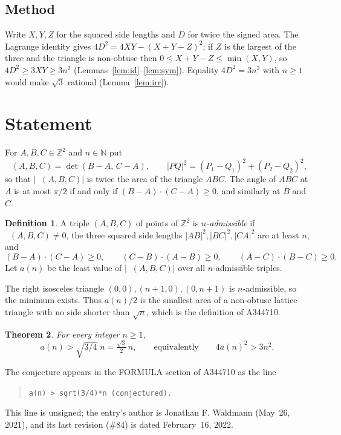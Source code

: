 \documentclass[11pt]{amsart}
\theoremstyle{plain}
\newtheorem{theorem}{Theorem}
\theoremstyle{definition}
\newtheorem{definition}[theorem]{Definition}
\newcommand{\N}{\mathbb{N}}
\newcommand{\Z}{\mathbb{Z}}
\DeclareMathOperator{\dett}{det_2}
\begin{document}
\subsection*{Method}
Write $X,Y,Z$ for the squared side lengths and $D$ for twice the signed area. The Lagrange identity gives $4D^2=4XY-(X+Y-Z)^2$; if $Z$ is the largest of the three and the triangle is non-obtuse then $0\le X+Y-Z\le\min(X,Y)$, so $4D^2\ge3XY\ge3n^2$ (Lemmas~\ref{lem:id}--\ref{lem:sym}). Equality $4D^2=3n^2$ with $n\ge1$ would make $\sqrt3$ rational (Lemma~\ref{lem:irr}).

\section{Statement}\label{sec:statement}

For $A,B,C\in\Z^2$ and $n\in\N$ put
\[
  \dett(A,B,C)=\det(B-A,\,C-A),\qquad |PQ|^2=(P_1-Q_1)^2+(P_2-Q_2)^2 ,
\]
so that $|\dett(A,B,C)|$ is twice the area of the triangle $ABC$. The angle of $ABC$ at $A$ is at most $\pi/2$ if and only if $(B-A)\cdot(C-A)\ge0$, and similarly at $B$ and $C$.

\begin{definition}\label{def:adm}
A triple $(A,B,C)$ of points of $\Z^2$ is \emph{$n$-admissible} if $\dett(A,B,C)\ne0$, the three squared side lengths $|AB|^2,|BC|^2,|CA|^2$ are at least $n$, and
\[
  (B-A)\cdot(C-A)\ge0,\qquad (C-B)\cdot(A-B)\ge0,\qquad (A-C)\cdot(B-C)\ge0 .
\]
Let $a(n)$ be the least value of $|\dett(A,B,C)|$ over all $n$-admissible triples.
\end{definition}

The right isosceles triangle $(0,0),(n+1,0),(0,n+1)$ is $n$-admissible, so the minimum exists. Thus $a(n)/2$ is the smallest area of a non-obtuse lattice triangle with no side shorter than $\sqrt n$, which is the definition of A344710.

\begin{theorem}\label{thm:main}
For every integer $n\ge1$,
\[
  a(n)>\sqrt{3/4}\;n=\tfrac{\sqrt3}{2}\,n ,\qquad\text{equivalently}\qquad 4a(n)^2>3n^2 .
\]
\end{theorem}

The conjecture appears in the FORMULA section of A344710 \cite{A344710} as the line
\begin{quote}
{\small\texttt{a(n) > sqrt(3/4)*n (conjectured).}}
\end{quote}
This line is unsigned; the entry's author is Jonathan F. Waldmann (May~26, 2021), and its last revision (\#84) is dated February~16, 2022.
\end{document}
